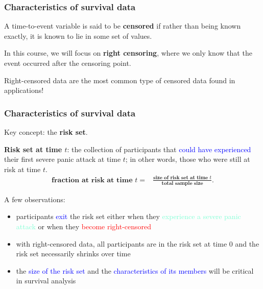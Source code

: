 \documentclass[12pt, 
hyperref={colorlinks=true, linkcolor=blue, urlcolor=cyan},dvipsnames]{beamer}
\begin{document}
\begin{frame}
\frametitle{Characteristics of survival data}
A time-to-event variable is said to be \textbf{censored} if rather than being known exactly, it is known to lie in some set of values.

In this course, we will focus on \textbf{right censoring}, where we only know that the event occurred after the censoring point.

Right-censored data are the most common type of censored data found in applications!
\end{frame}

\begin{frame}
\frametitle{Characteristics of survival data}
Key concept: the \textbf{risk set}.

\textbf{Risk set at time $t$}: the collection of participants that \textcolor{blue}{could have experienced} their first severe panic attack at time $t$; in other words, those who were still at risk at time $t$.
\vspace{-0.3cm}
\begin{align*}
\textbf{fraction at risk at time } t = & \frac{\textbf{size of risk set at time } t}{\textbf{total sample size}}.
\end{align*}

A few observations:\vspace{-0.3cm}
\begin{itemize}
\item participants \textcolor{blue}{exit} the risk set either when they \textcolor{Aquamarine}{experience a severe panic attack} or when they \textcolor{red}{become right-censored}
\item with right-censored data, all participants are in the risk set at time 0 and the risk set necessarily shrinks over time
\item the \textcolor{blue}{size of the risk set} and the \textcolor{blue}{characteristics of its members} will be critical in survival analysis
\end{itemize}
\end{frame}
\end{document}
